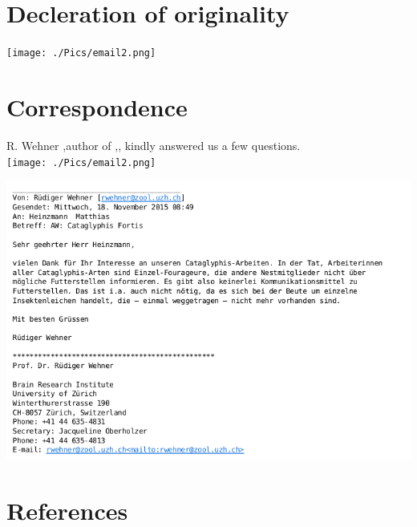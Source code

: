 \documentclass[11pt]{article}
\begin{document}
\newpage
\section{Decleration of originality}
\texttt{[image: ./Pics/email2.png]}%

\newpage


\section{Correspondence} \label{Sec:Correspondence}
R. Wehner ,author of \cite{Wehner2003},\cite{Wehner1988}, \cite{Wehner1998} kindly answered us a few questions.\\


\texttt{[image: ./Pics/email2.png]}%

\includegraphics[scale=0.8]{./RWehner.png}%


\section{References}
  

\nocite{Wehner2008}
\nocite{Wehner2003}
\nocite{Wehner1988}
\nocite{GordonTeam2008}
\nocite{Mathworks2015}
\thispagestyle{plain}
\end{document}
